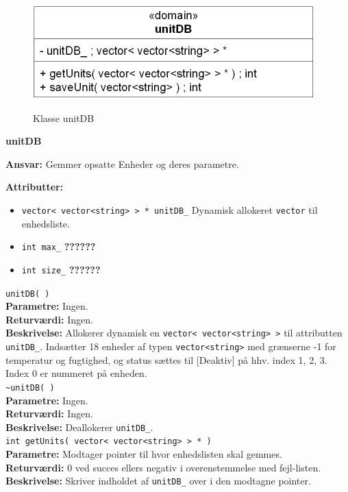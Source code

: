 \newpage

\begin{figure}[htbp] \centering
{\includegraphics[scale=1.5]{filer/design/Klassediagrammer/sw_unitDB}}
\caption{Klasse unitDB}
\label{fig:unitDB klassediagram}
\end{figure} 

{\centering
\textbf{unitDB}\par
}
\textbf{Ansvar:} Gemmer opsatte Enheder og deres parametre. \

\textbf{Attributter:}
\begin{itemize}
	\item \verb+vector< vector<string> > * unitDB_+ Dynamisk allokeret \verb+vector+ til enhedsliste.
	\item \verb+int max_+ \textbf{??????}
	\item \verb+int size_+ \textbf{??????}
\end{itemize}

\verb+unitDB( ) +\\
\textbf{Parametre:} Ingen.\\
\textbf{Returværdi:} Ingen. \\
\textbf{Beskrivelse:} Allokerer dynamisk en \verb+vector< vector<string> >+ til attributten \verb+unitDB_+. Indsætter 18 enheder af typen \verb+vector<string>+ med grænserne -1 for temperatur og fugtighed, og status sættes til [Deaktiv] på hhv. index 1, 2, 3. Index 0 er nummeret på enheden. \\

\verb+~unitDB( ) +\\
\textbf{Parametre:} Ingen.\\
\textbf{Returværdi:} Ingen. \\
\textbf{Beskrivelse:} Deallokerer \verb+unitDB_+. \\

\verb+int getUnits( vector< vector<string> > * ) +\\
\textbf{Parametre:} Modtager pointer til hvor enhedslisten skal gemmes.\\
\textbf{Returværdi:} 0 ved succes ellers negativ i overenstemmelse med fejl-listen. \\
\textbf{Beskrivelse:} Skriver indholdet af \verb+unitDB_+ over i den modtagne pointer. \\

